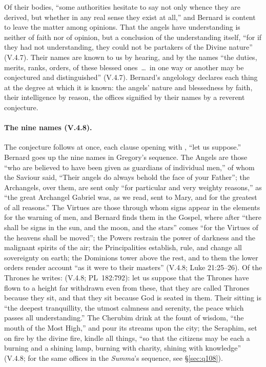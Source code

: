 \noindent Of their bodies, ``some authorities hesitate to say not only
whence they are derived, but whether in any real sense they exist at all,''
and Bernard is content to leave the matter among opinions. That the angels
have understanding is neither of faith nor of opinion, but a conclusion of
the understanding itself, ``for if they had not understanding, they could
not be partakers of the Divine nature'' (V.4.7). Their names are known to us
by hearing, and by the names ``the duties, merits, ranks, orders, of these
blessed ones~\dots\ in one way or another may be conjectured and
distinguished'' (V.4.7). Bernard's angelology declares each thing at the
degree at which it is known: the angels' nature and blessedness by faith,
their intelligence by reason, the offices signified by their names by a
reverent conjecture.

\paragraph{The nine names (V.4.8).} The conjecture follows at once, each
clause opening with , ``let us suppose.'' Bernard goes up the
nine names in Gregory's sequence. The Angels are those ``who are believed to
have been given as guardians of individual men,'' of whom the Saviour said,
``Their angels do always behold the face of your Father''; the
Archangels, over them, are sent only ``for particular and very weighty
reasons,'' as ``the great Archangel Gabriel was, as we read, sent to Mary,
and for the greatest of all reasons.'' The Virtues are those through whom
signs appear in the elements for the warning of men, and Bernard finds them
in the Gospel, where after ``there shall be signs in the sun, and the moon,
and the stars'' comes ``for the Virtues of the heavens shall be moved'';
the Powers restrain the power of darkness and the malignant spirits of the
air; the Principalities establish, rule, and change all sovereignty on
earth; the Dominions tower above the rest, and to them the lower orders
render account ``as it were to their masters'' (V.4.8; Luke 21:25--26). Of
the Thrones he writes:  (V.4.8; PL~182:792): let us suppose that the Thrones have
flown to a height far withdrawn even from these, that they are called
Thrones because they sit, and that they sit because God is seated in them.
Their sitting is ``the deepest tranquillity, the utmost calmness and
serenity, the peace which passes all understanding.'' The Cherubim drink at
the fount of wisdom, ``the mouth of the Most High,'' and pour its streams
upon the city; the Seraphim, set on fire by the divine fire, kindle all
things, ``so that the citizens may be each a burning and a shining lamp,
burning with charity, shining with knowledge'' (V.4.8; for the same offices in the \emph{Summa}'s sequence, see \S\ref{sec:q108}).

